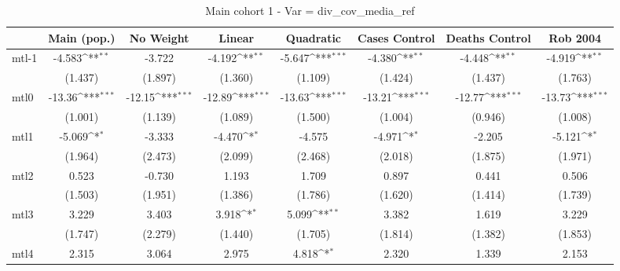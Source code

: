 \documentclass{article}
\begin{document}
{
\def\sym#1{\ifmmode^{#1}\else\(^{#1}\)\fi}
\begin{longtable}{l*{7}{c}}
\caption{Main cohort 1 - Var = div\_cov\_media\_ref}\\
\hline\hline\endfirsthead\hline\endhead\hline\endfoot\endlastfoot
                &\multicolumn{1}{c}{Main (pop.)}&\multicolumn{1}{c}{No Weight}&\multicolumn{1}{c}{Linear}&\multicolumn{1}{c}{Quadratic}&\multicolumn{1}{c}{Cases Control}&\multicolumn{1}{c}{Deaths Control}&\multicolumn{1}{c}{Rob 2004}\\
\hline
mtl-1           &   -4.583\sym{**} &   -3.722         &   -4.192\sym{**} &   -5.647\sym{***}&   -4.380\sym{**} &   -4.448\sym{**} &   -4.919\sym{**} \\
                &  (1.437)         &  (1.897)         &  (1.360)         &  (1.109)         &  (1.424)         &  (1.437)         &  (1.763)         \\
mtl0            &   -13.36\sym{***}&   -12.15\sym{***}&   -12.89\sym{***}&   -13.63\sym{***}&   -13.21\sym{***}&   -12.77\sym{***}&   -13.73\sym{***}\\
                &  (1.001)         &  (1.139)         &  (1.089)         &  (1.500)         &  (1.004)         &  (0.946)         &  (1.008)         \\
mtl1            &   -5.069\sym{*}  &   -3.333         &   -4.470\sym{*}  &   -4.575         &   -4.971\sym{*}  &   -2.205         &   -5.121\sym{*}  \\
                &  (1.964)         &  (2.473)         &  (2.099)         &  (2.468)         &  (2.018)         &  (1.875)         &  (1.971)         \\
mtl2            &    0.523         &   -0.730         &    1.193         &    1.709         &    0.897         &    0.441         &    0.506         \\
                &  (1.503)         &  (1.951)         &  (1.386)         &  (1.786)         &  (1.620)         &  (1.414)         &  (1.739)         \\
mtl3            &    3.229         &    3.403         &    3.918\sym{*}  &    5.099\sym{**} &    3.382         &    1.619         &    3.229         \\
                &  (1.747)         &  (2.279)         &  (1.440)         &  (1.705)         &  (1.814)         &  (1.382)         &  (1.853)         \\
mtl4            &    2.315         &    3.064         &    2.975         &    4.818\sym{*}  &    2.320         &    1.339         &    2.153         \\

\end{longtable}}
\end{document}
